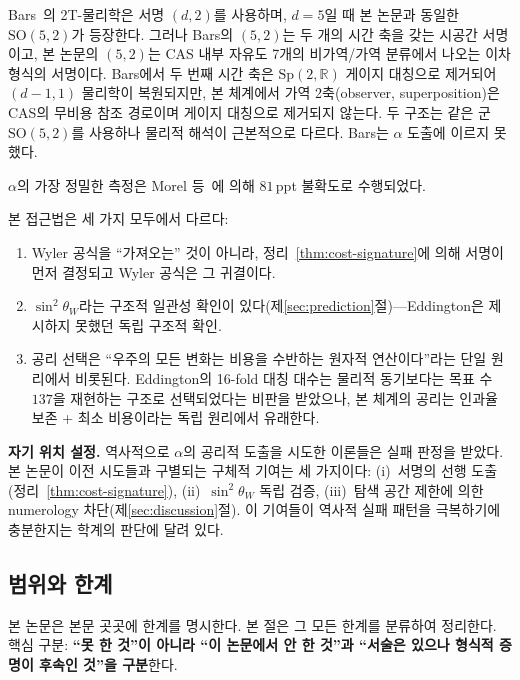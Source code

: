 \documentclass[entropy,article,submit,pdftex,oneauthor]{Definitions/mdpi}
\begin{document}
Bars~\cite{bars2006}의 2T-물리학은 서명 $(d,2)$를 사용하며, $d=5$일 때 본 논문과 동일한 $\mathrm{SO}(5,2)$가 등장한다. 그러나 Bars의 $(5,2)$는 두 개의 시간 축을 갖는 시공간 서명이고, 본 논문의 $(5,2)$는 CAS 내부 자유도 7개의 비가역/가역 분류에서 나오는 이차형식의 서명이다. Bars에서 두 번째 시간 축은 $\mathrm{Sp}(2,\mathbb{R})$ 게이지 대칭으로 제거되어 $(d-1,1)$ 물리학이 복원되지만, 본 체계에서 가역 2축(observer, superposition)은 CAS의 무비용 참조 경로이며 게이지 대칭으로 제거되지 않는다. 두 구조는 같은 군 $\mathrm{SO}(5,2)$를 사용하나 물리적 해석이 근본적으로 다르다. Bars는 $\alpha$ 도출에 이르지 못했다.

$\alpha$의 가장 정밀한 측정은 Morel 등~\cite{morel2020}에 의해 $81$\,ppt 불확도로 수행되었다.

본 접근법은 세 가지 모두에서 다르다:
\begin{enumerate}
\item Wyler 공식을 ``가져오는'' 것이 아니라, 정리~\ref{thm:cost-signature}에 의해 서명이 먼저 결정되고 Wyler 공식은 그 귀결이다.
\item $\sin^2\theta_W$라는 구조적 일관성 확인이 있다(제\ref{sec:prediction}절)---Eddington은 제시하지 못했던 독립 구조적 확인.
\item 공리 선택은 ``우주의 모든 변화는 비용을 수반하는 원자적 연산이다''라는 단일 원리에서 비롯된다. Eddington의 16-fold 대칭 대수는 물리적 동기보다는 목표 수 $137$을 재현하는 구조로 선택되었다는 비판을 받았으나, 본 체계의 공리는 인과율 보존 + 최소 비용이라는 독립 원리에서 유래한다.
\end{enumerate}

\textbf{자기 위치 설정.} 역사적으로 $\alpha$의 공리적 도출을 시도한 이론들은 실패 판정을 받았다. 본 논문이 이전 시도들과 구별되는 구체적 기여는 세 가지이다: (i)~서명의 선행 도출(정리~\ref{thm:cost-signature}), (ii)~$\sin^2\theta_W$ 독립 검증, (iii)~탐색 공간 제한에 의한 numerology 차단(제\ref{sec:discussion}절). 이 기여들이 역사적 실패 패턴을 극복하기에 충분한지는 학계의 판단에 달려 있다.

\subsection{범위와 한계}
\label{sec:limitations}

본 논문은 본문 곳곳에 한계를 명시한다. 본 절은 그 모든 한계를 분류하여 정리한다. 핵심 구분: \textbf{``못 한 것''이 아니라 ``이 논문에서 안 한 것''과 ``서술은 있으나 형식적 증명이 후속인 것''을 구분}한다.
\end{document}
